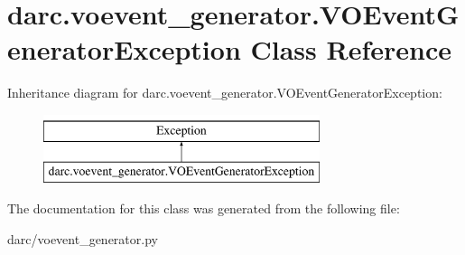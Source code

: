 \hypertarget{classdarc_1_1voevent__generator_1_1_v_o_event_generator_exception}{}\section{darc.\+voevent\+\_\+generator.\+V\+O\+Event\+Generator\+Exception Class Reference}
\label{classdarc_1_1voevent__generator_1_1_v_o_event_generator_exception}
Inheritance diagram for darc.\+voevent\+\_\+generator.\+V\+O\+Event\+Generator\+Exception\+:\begin{figure}[H]
\begin{center}
\leavevmode
\includegraphics[height=2.000000cm]{classdarc_1_1voevent__generator_1_1_v_o_event_generator_exception}
\end{center}
\end{figure}


The documentation for this class was generated from the following file\+:\begin{DoxyCompactItemize}
\item 
darc/voevent\+\_\+generator.\+py\end{DoxyCompactItemize}
